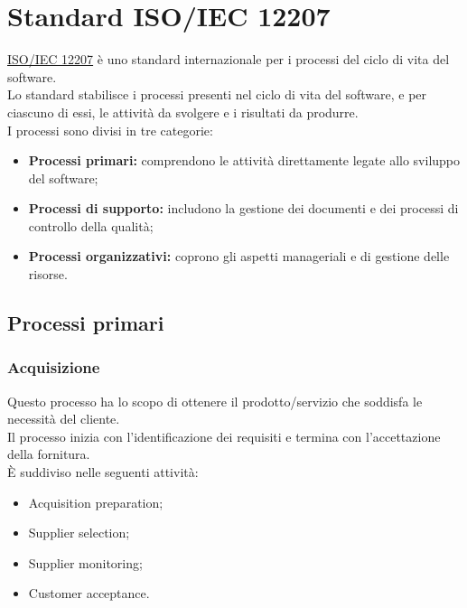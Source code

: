 \appendix

\section{Standard ISO/IEC 12207} \label{section:ISO_IEC_12207}
\href{https://www.math.unipd.it/~tullio/IS-1/2009/Approfondimenti/ISO_12207-1995.pdf}{ISO/IEC 12207} è uno standard internazionale per i processi del ciclo di vita del software.\\
Lo standard stabilisce i processi presenti nel ciclo di vita del software, e per ciascuno di essi, le attività da svolgere e i risultati da produrre.\\
I processi sono divisi in tre categorie:
\begin{itemize}
  \item \textbf{Processi primari:} comprendono le attività direttamente legate allo sviluppo del software;
  \item \textbf{Processi di supporto:} includono la gestione dei documenti e dei processi di controllo della qualità;
  \item \textbf{Processi organizzativi:} coprono gli aspetti manageriali e di gestione delle risorse.
\end{itemize}

\subsection{Processi primari} \label{subsection:processi_primari}
\subsubsection{Acquisizione}
Questo processo ha lo scopo di ottenere il prodotto/servizio che soddisfa le necessità del cliente.\\
Il processo inizia con l'identificazione dei requisiti e termina con l'accettazione della fornitura.\\
È suddiviso nelle seguenti attività:
\begin{itemize}
  \item Acquisition preparation;
  \item Supplier selection;
  \item Supplier monitoring;
  \item Customer acceptance.
\end{itemize}

